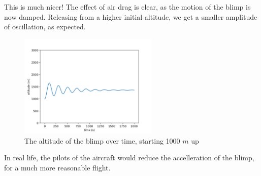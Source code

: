 \documentclass[titlepage]{article}
\begin{document}
This is much nicer! The effect of air drag is clear, as the motion of the blimp is now damped. Releasing from a higher initial altitude, we get a smaller amplitude of oscillation, as expected.
\begin{figure}[h]
    \centering
    \includegraphics[width=250px]{p2_drag_1000.png}
    \caption{The altitude of the blimp over time, starting 1000 $m$ up}
\end{figure}
In real life, the pilots of the aircraft would reduce the accelleration of the blimp, for a much more reasonable flight.

\newpage



\thispagestyle{empty}
\end{document}
